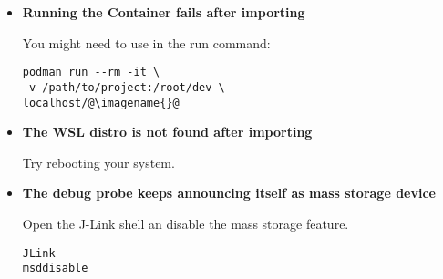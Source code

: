 \begin{itemize}
  \item {\bf Running the Container fails after importing}

    You might need to use  in the run command:

  \begin{lstlisting}
podman run --rm -it \
-v /path/to/project:/root/dev \
localhost/@\imagename{}@
\end{lstlisting}
  \item {\bf The WSL distro is not found after importing}

    Try rebooting your system.
  \item {\bf The debug probe keeps announcing itself as mass storage device}

    Open the J-Link shell an disable the mass storage feature.

  \begin{lstlisting}
JLink
msddisable
\end{lstlisting}
\end{itemize}
